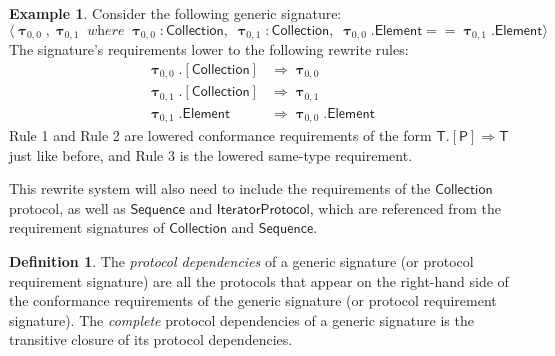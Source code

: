 \documentclass[a4paper,headsepline,bibliography=totoc,toc=flat,fleqn,twoside=semi]{scrbook}
\theoremstyle{definition}
\newtheorem{definition}{Definition}[chapter]
\theoremstyle{definition}
\newtheorem{example}{Example}[chapter]
\theoremstyle{definition}
\newcommand{\namesym}[1]{\mathsf{#1}}
\newcommand{\proto}[1]{\bm{\mathsf{#1}}}
\newcommand{\protosym}[1]{[\proto{#1}]}
\newcommand{\gensig}[2]{\langle #1\;\textit{where}\;#2\rangle}
\newcommand{\genericsym}[2]{\bm{\uptau}_{#1,#2}}
\begin{document}
\begin{example}
Consider the following generic signature:
\[\gensig{\genericsym{0}{0},\genericsym{0}{1}}{\genericsym{0}{0}\colon\proto{Collection},\;\genericsym{0}{1}\colon\proto{Collection},\;\genericsym{0}{0}.\namesym{Element}==\genericsym{0}{1}.\namesym{Element}}\]
The signature's requirements lower to the following rewrite rules:
\begin{align}
\genericsym{0}{0}.\protosym{Collection}&\Rightarrow\genericsym{0}{0}\tag{1}\\
\genericsym{0}{1}.\protosym{Collection}&\Rightarrow\genericsym{0}{1}\tag{2}\\
\genericsym{0}{1}.\namesym{Element}&\Rightarrow\genericsym{0}{0}.\namesym{Element}\tag{3}
\end{align}
Rule 1 and Rule 2 are lowered conformance requirements of the form $\namesym{T}.\protosym{P}\Rightarrow\namesym{T}$ just like before, and Rule 3 is the lowered same-type requirement.

This rewrite system will also need to include the requirements of the $\proto{Collection}$ protocol, as well as $\proto{Sequence}$ and $\proto{IteratorProtocol}$, which are referenced from the requirement signatures of $\proto{Collection}$ and $\proto{Sequence}$.
\end{example}
\begin{definition}The \emph{protocol dependencies} of a generic signature (or protocol requirement signature) are all the protocols that appear on the right-hand side of the conformance requirements of the generic signature (or protocol requirement signature). The \emph{complete} protocol dependencies of a generic signature is the transitive closure of its protocol dependencies.
\end{definition}
\end{document}
